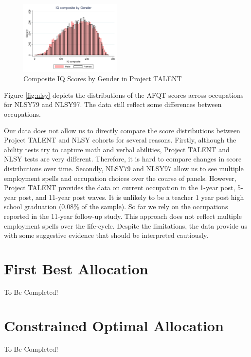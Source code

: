 \documentclass[onehalfspacing,11pt]{article}
\begin{document}
\begin{figure}
\begin{center}
\includegraphics[width=2in]{iq_by_gender.pdf}
\caption{Composite IQ Scores by Gender in Project TALENT}
\label{fig:IQbygender}
\end{center}
\end{figure}


Figure \ref{fig:nlsy} depicts the distributions of the AFQT scores across occupations for NLSY79 and NLSY97. The data still reflect some differences between occupations.
	
Our data does not allow us to directly compare the score distributions between Project TALENT and NLSY cohorts for several reasons. Firstly, although the ability tests try to capture math and verbal abilities, Project TALENT and NLSY tests are very different. Therefore, it is hard to compare changes in score distributions over time. Secondly, NLSY79 and NLSY97 allow us to see multiple employment spells and occupation choices over the course of panels. However, Project TALENT provides the data on current occupation in the 1-year post, 5-year post, and 11-year post waves. It is unlikely to be a teacher 1 year post high school graduation (0.08\% of the sample). So far we rely on the occupations reported in the 11-year follow-up study. This approach does not reflect multiple employment spells over the life-cycle. Despite the limitations, the data provide us with some suggestive evidence that should be interpreted cautiously.

\section{First Best Allocation}
{\sc To Be Completed!}
\section{Constrained Optimal Allocation}
{\sc To Be Completed!}
\end{document}
